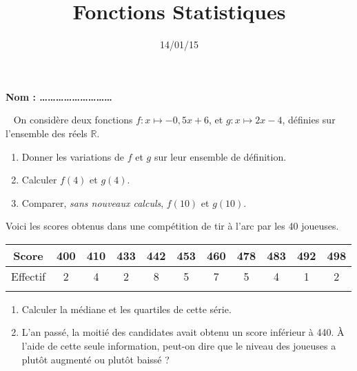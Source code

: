 \documentclass[12pt]{article}
\title{Fonctions Statistiques}
\date{14/01/15}
\begin{document}
\textbf{\Large Nom : \ldots\ldots\ldots\ldots\ldots\ldots\ldots\ldots\ldots}
\vspace{.5cm}

\maketitle

\begin{exercice}~
  On considère deux fonctions $f:x\mapsto -0,5x+6$, et $g:x\mapsto 2x-4$,
  définies sur l'ensemble des réels $\mathbb{R}$.
  \begin{enumerate}
    \item Donner les variations de $f$ et $g$ sur leur ensemble de définition.
    \item Calculer $f(4)$ et $g(4)$.
    \item Comparer, \emph{sans nouveaux calculs}, $f(10)$ et $g(10)$.
  \end{enumerate}
\end{exercice}

\begin{exercice}
  Voici les scores obtenus dans une compétition de tir à l'arc par
  les 40 joueuses.

  \begin{tabular}{c||c|c|c|c|c|c|c|c|c|c}
    Score
    & 400
    & 410
    & 433
    & 442
    & 453
    & 460
    & 478
    & 483
    & 492
    & 498
    \\
    \hline
    Effectif
    & 2
    & 4
    & 2
    & 8
    & 5
    & 7
    & 5
    & 4
    & 1
    & 2
    \\
    \hline
    &&&&&&&&&&
  \end{tabular}

  \begin{enumerate}
  \item Calculer la médiane et les quartiles de cette série.
  \item L'an passé, la moitié des candidates avait obtenu un score inférieur à
    440. À l'aide de cette seule information, peut-on dire que le niveau des
    joueuses a plutôt augmenté ou plutôt baissé ?
  \end{enumerate}

\end{exercice}
\end{document}

